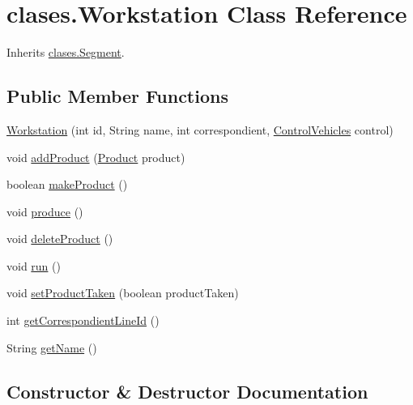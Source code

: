 \hypertarget{classclases_1_1_workstation}{}\section{clases.\+Workstation Class Reference}
\label{classclases_1_1_workstation}


Inherits \mbox{\hyperlink{classclases_1_1_segment}{clases.\+Segment}}.

\subsection*{Public Member Functions}
\begin{DoxyCompactItemize}
\item 
\mbox{\hyperlink{classclases_1_1_workstation_a81abee084e638682e32fa9042a307f57}{Workstation}} (int id, String name, int correspondient, \mbox{\hyperlink{classcontrol_1_1_control_vehicles}{Control\+Vehicles}} control)
\item 
void \mbox{\hyperlink{classclases_1_1_workstation_aa5bcfb9b65f5aa9c78018e6eef6d1e15}{add\+Product}} (\mbox{\hyperlink{classclases_1_1_product}{Product}} product)
\item 
boolean \mbox{\hyperlink{classclases_1_1_workstation_a7c939640ac4011d8ed63cab70edeb09a}{make\+Product}} ()
\item 
void \mbox{\hyperlink{classclases_1_1_workstation_a2c5a4f165feee335d1aad454847c6544}{produce}} ()
\item 
void \mbox{\hyperlink{classclases_1_1_workstation_a0fd86ec18770db6098c19c62fd4370d4}{delete\+Product}} ()
\item 
void \mbox{\hyperlink{classclases_1_1_workstation_a163438e5a169b92b5fccee9f794558c3}{run}} ()
\item 
void \mbox{\hyperlink{classclases_1_1_workstation_ace5b5928bee2bcbb8b4be09e8c94a7b1}{set\+Product\+Taken}} (boolean product\+Taken)
\item 
int \mbox{\hyperlink{classclases_1_1_workstation_a608fe1411c5cd999e62649cf8d51c328}{get\+Correspondient\+Line\+Id}} ()
\item 
String \mbox{\hyperlink{classclases_1_1_workstation_a26e1bf628712f17bb7c35b830a9aaa9a}{get\+Name}} ()
\end{DoxyCompactItemize}


\subsection{Constructor \& Destructor Documentation}
\mbox{\label{classclases_1_1_workstation_a81abee084e638682e32fa9042a307f57}} 
